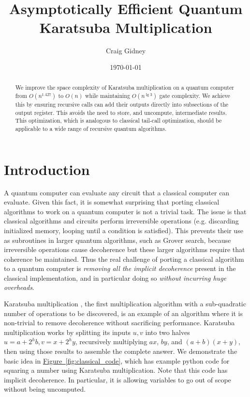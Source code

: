 \documentclass[onecolumn]{quantumarticle}
\newcommand{\fig}[1]{\hyperref[fig:#1]{Figure~\ref*{fig:#1}}}
\begin{document}
\title{Asymptotically Efficient Quantum Karatsuba Multiplication}

\date{\today}
\author{Craig Gidney}

\begin{abstract}
We improve the space complexity of Karatsuba multiplication on a quantum computer from $O(n^{1.427})$ to $O(n)$ while maintaining $O(n^{\lg 3})$ gate complexity.
We achieve this by ensuring recursive calls can add their outputs directly into subsections of the output register.
This avoids the need to store, and uncompute, intermediate results.
This optimization, which is analogous to classical tail-call optimization, should be applicable to a wide range of recursive quantum algorithms.
\end{abstract}

\maketitle


\section{Introduction}
\label{sec:introduction}

A quantum computer can evaluate any circuit that a classical computer can evaluate.
Given this fact, it is somewhat surprising that porting classical algorithms to work on a quantum computer is not a trivial task.
The issue is that classical algorithms and circuits perform irreversible operations (e.g. discarding initialized memory, looping until a condition is satisfied).
This prevents their use as subroutines in larger quantum algorithms, such as Grover search, because irreversible operations cause decoherence but these larger algorithms require that coherence be maintained.
Thus the real challenge of porting a classical algorithm to a quantum computer is {\em removing all the implicit decoherence} present in the classical implementation, and in particular doing so {\em without incurring huge overheads}.

Karatsuba multiplication \cite{karatsuba1962multiplication}, the first multiplication algorithm with a sub-quadratic number of operations to be discovered, is an example of an algorithm where it is non-trivial to remove decoherence without sacrificing performance.
Karatsuba multiplication works by splitting its inputs $u, v$ into two halves $u=a+2^{h} b, v=x+2^{h} y$, recursively multiplying $ax$, $by$, and $(a+b)(x+y)$, then using those results to assemble the complete answer.
We demonstrate the basic idea in \fig{classical_code}, which has example python code for squaring a number using Karatsuba multiplication.
Note that this code has implicit decoherence.
In particular, it is allowing variables to go out of scope without being uncomputed.
\end{document}
